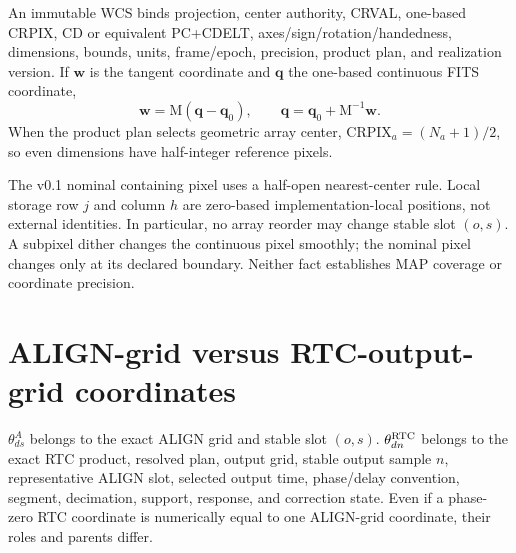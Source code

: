\documentclass[10pt]{article}
\renewcommand{\mathsf}[1]{\mathrm{#1}}
\begin{document}
An immutable WCS binds projection, center authority, CRVAL, one-based CRPIX,
CD or equivalent PC+CDELT, axes/sign/rotation/handedness, dimensions, bounds,
units, frame/epoch, precision, product plan, and realization version. If
$\boldsymbol w$ is the tangent coordinate and $\boldsymbol q$ the one-based
continuous FITS coordinate,
\begin{equation*}
 \boldsymbol w=\mathsf M(\boldsymbol q-\boldsymbol q_0),\qquad
 \boldsymbol q=\boldsymbol q_0+\mathsf M^{-1}\boldsymbol w.
\end{equation*}
When the product plan selects geometric array center,
$\mathrm{CRPIX}_a=(N_a+1)/2$, so even dimensions have half-integer reference
pixels.

The v0.1 nominal containing pixel uses a half-open nearest-center rule. Local
storage row $j$ and column $h$ are zero-based implementation-local positions,
not external identities. In particular, no array reorder may change stable
slot $(o,s)$. A subpixel dither changes the continuous pixel smoothly; the
nominal pixel changes only at its declared boundary. Neither fact establishes
MAP coverage or coordinate precision.

\begin{center}
\end{center}

\newpage
\section{ALIGN-grid versus RTC-output-grid coordinates}
$\theta^A_{ds}$ belongs to the exact ALIGN grid and stable slot $(o,s)$.
$\theta^{\rm RTC}_{dn}$ belongs to the exact RTC product, resolved plan,
output grid, stable output sample $n$, representative ALIGN slot, selected
output time, phase/delay convention, segment, decimation, support, response,
and correction state. Even if a phase-zero RTC coordinate is numerically
equal to one ALIGN-grid coordinate, their roles and parents differ.
\end{document}
